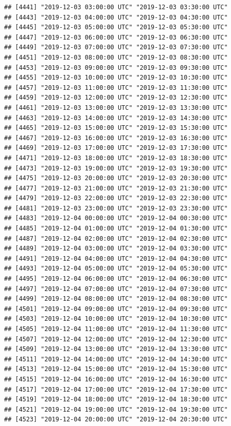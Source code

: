 \documentclass{article}\usepackage[]{graphicx}\usepackage[]{color}
\makeatletter
\newenvironment{kframe}{%
 \def\at@end@of@kframe{}%
 \ifinner\ifhmode%
  \def\at@end@of@kframe{\end{minipage}}%
  \begin{minipage}{\columnwidth}%
 \fi\fi%
 \def\FrameCommand##1{\hskip\@totalleftmargin \hskip-\fboxsep
 \colorbox{shadecolor}{##1}\hskip-\fboxsep
     \hskip-\linewidth \hskip-\@totalleftmargin \hskip\columnwidth}%
 \MakeFramed {\advance\hsize-\width
   \@totalleftmargin\z@ \linewidth\hsize
   \@setminipage}}%
 {\par\unskip\endMakeFramed%
 \at@end@of@kframe}
\newenvironment{knitrout}{}{} %
\makeatother
\begin{document}
\begin{knitrout}
\begin{kframe}
\begin{verbatim}
## [4441] "2019-12-03 03:00:00 UTC" "2019-12-03 03:30:00 UTC"
## [4443] "2019-12-03 04:00:00 UTC" "2019-12-03 04:30:00 UTC"
## [4445] "2019-12-03 05:00:00 UTC" "2019-12-03 05:30:00 UTC"
## [4447] "2019-12-03 06:00:00 UTC" "2019-12-03 06:30:00 UTC"
## [4449] "2019-12-03 07:00:00 UTC" "2019-12-03 07:30:00 UTC"
## [4451] "2019-12-03 08:00:00 UTC" "2019-12-03 08:30:00 UTC"
## [4453] "2019-12-03 09:00:00 UTC" "2019-12-03 09:30:00 UTC"
## [4455] "2019-12-03 10:00:00 UTC" "2019-12-03 10:30:00 UTC"
## [4457] "2019-12-03 11:00:00 UTC" "2019-12-03 11:30:00 UTC"
## [4459] "2019-12-03 12:00:00 UTC" "2019-12-03 12:30:00 UTC"
## [4461] "2019-12-03 13:00:00 UTC" "2019-12-03 13:30:00 UTC"
## [4463] "2019-12-03 14:00:00 UTC" "2019-12-03 14:30:00 UTC"
## [4465] "2019-12-03 15:00:00 UTC" "2019-12-03 15:30:00 UTC"
## [4467] "2019-12-03 16:00:00 UTC" "2019-12-03 16:30:00 UTC"
## [4469] "2019-12-03 17:00:00 UTC" "2019-12-03 17:30:00 UTC"
## [4471] "2019-12-03 18:00:00 UTC" "2019-12-03 18:30:00 UTC"
## [4473] "2019-12-03 19:00:00 UTC" "2019-12-03 19:30:00 UTC"
## [4475] "2019-12-03 20:00:00 UTC" "2019-12-03 20:30:00 UTC"
## [4477] "2019-12-03 21:00:00 UTC" "2019-12-03 21:30:00 UTC"
## [4479] "2019-12-03 22:00:00 UTC" "2019-12-03 22:30:00 UTC"
## [4481] "2019-12-03 23:00:00 UTC" "2019-12-03 23:30:00 UTC"
## [4483] "2019-12-04 00:00:00 UTC" "2019-12-04 00:30:00 UTC"
## [4485] "2019-12-04 01:00:00 UTC" "2019-12-04 01:30:00 UTC"
## [4487] "2019-12-04 02:00:00 UTC" "2019-12-04 02:30:00 UTC"
## [4489] "2019-12-04 03:00:00 UTC" "2019-12-04 03:30:00 UTC"
## [4491] "2019-12-04 04:00:00 UTC" "2019-12-04 04:30:00 UTC"
## [4493] "2019-12-04 05:00:00 UTC" "2019-12-04 05:30:00 UTC"
## [4495] "2019-12-04 06:00:00 UTC" "2019-12-04 06:30:00 UTC"
## [4497] "2019-12-04 07:00:00 UTC" "2019-12-04 07:30:00 UTC"
## [4499] "2019-12-04 08:00:00 UTC" "2019-12-04 08:30:00 UTC"
## [4501] "2019-12-04 09:00:00 UTC" "2019-12-04 09:30:00 UTC"
## [4503] "2019-12-04 10:00:00 UTC" "2019-12-04 10:30:00 UTC"
## [4505] "2019-12-04 11:00:00 UTC" "2019-12-04 11:30:00 UTC"
## [4507] "2019-12-04 12:00:00 UTC" "2019-12-04 12:30:00 UTC"
## [4509] "2019-12-04 13:00:00 UTC" "2019-12-04 13:30:00 UTC"
## [4511] "2019-12-04 14:00:00 UTC" "2019-12-04 14:30:00 UTC"
## [4513] "2019-12-04 15:00:00 UTC" "2019-12-04 15:30:00 UTC"
## [4515] "2019-12-04 16:00:00 UTC" "2019-12-04 16:30:00 UTC"
## [4517] "2019-12-04 17:00:00 UTC" "2019-12-04 17:30:00 UTC"
## [4519] "2019-12-04 18:00:00 UTC" "2019-12-04 18:30:00 UTC"
## [4521] "2019-12-04 19:00:00 UTC" "2019-12-04 19:30:00 UTC"
## [4523] "2019-12-04 20:00:00 UTC" "2019-12-04 20:30:00 UTC"

\end{verbatim}
\end{kframe}
\end{knitrout}
\end{document}
